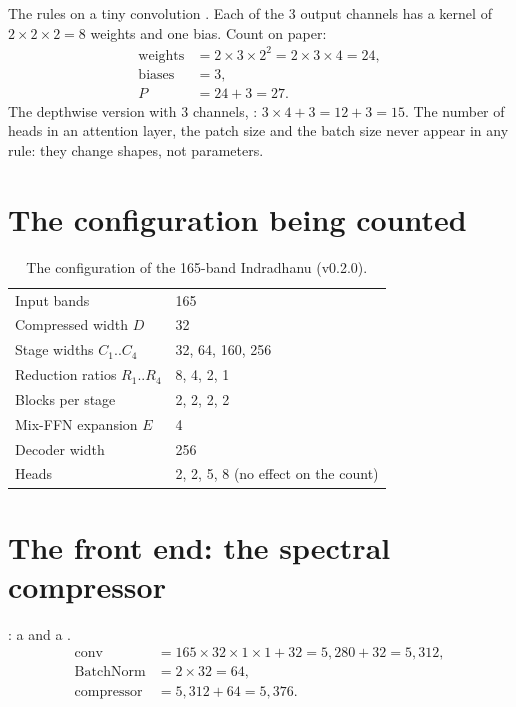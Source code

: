 \begin{worked}[label={we:params:tiny}]{The rules on a tiny convolution}
. Each of the 3 output channels has a kernel of $2 \times 2 \times 2 = 8$
weights and one bias. Count on paper:
\begin{align*}
\text{weights} &= 2 \times 3 \times 2^2 = 2 \times 3 \times 4 = 24,\\
\text{biases} &= 3,\\
P &= 24 + 3 = 27 .
\end{align*}
The depthwise version with 3 channels, : $3 \times 4 + 3 = 12 + 3 =
15$. The number of heads in an attention layer, the patch size and the batch size never appear in any
rule: they change shapes, not parameters.
\end{worked}

\section{The configuration being counted}\label{sec:params:config}

\begin{table}[htbp]\centering
\caption{The configuration of the 165-band Indradhanu (v0.2.0).}\label{tab:params:config}
\begin{tabular}{@{}ll@{}}\toprule
Input bands & 165 \\
Compressed width $D$ & 32 \\
Stage widths $C_1..C_4$ & 32, 64, 160, 256 \\
Reduction ratios $R_1..R_4$ & 8, 4, 2, 1 \\
Blocks per stage & 2, 2, 2, 2 \\
Mix-FFN expansion $E$ & 4 \\
Decoder width & 256 \\
Heads & 2, 2, 5, 8 (no effect on the count) \\\bottomrule
\end{tabular}
\end{table}

\section{The front end: the spectral compressor}\label{sec:params:compressor}

: a  and a .
\begin{align*}
\text{conv} &= 165 \times 32 \times 1 \times 1 + 32 = 5{,}280 + 32 = 5{,}312,\\
\text{BatchNorm} &= 2 \times 32 = 64,\\
\text{compressor} &= 5{,}312 + 64 = 5{,}376 .
\end{align*}

